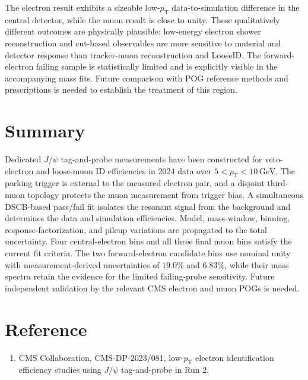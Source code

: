 \documentclass[11pt,a4paper]{article}
\newcommand{\pt}{p_{\mathrm{T}}}
\begin{document}
The electron result exhibits a sizeable low-$\pt$ data-to-simulation difference in the central detector, while the muon result is close to unity.  These qualitatively different outcomes are physically plausible: low-energy electron shower reconstruction and cut-based observables are more sensitive to material and detector response than tracker-muon reconstruction and LooseID.  The forward-electron failing sample is statistically limited and is explicitly visible in the accompanying mass fits.  Future comparison with POG reference methods and prescriptions is needed to establish the treatment of this region.

\section{Summary}

Dedicated $J/\psi$ tag-and-probe measurements have been constructed for veto-electron and loose-muon ID efficiencies in 2024 data over $5<\pt<10\,\mathrm{GeV}$.  The parking trigger is external to the measured electron pair, and a disjoint third-muon topology protects the muon measurement from trigger bias.  A simultaneous DSCB-based pass/fail fit isolates the resonant signal from the background and determines the data and simulation efficiencies.  Model, mass-window, binning, response-factorization, and pileup variations are propagated to the total uncertainty.  Four central-electron bins and all three final muon bins satisfy the current fit criteria.  The two forward-electron candidate bins use nominal unity with measurement-derived uncertainties of $19.0\%$ and $6.83\%$, while their mass spectra retain the evidence for the limited failing-probe sensitivity.  Future independent validation by the relevant CMS electron and muon POGs is needed.

\section*{Reference}
\begin{enumerate}[leftmargin=7mm]
  \item CMS Collaboration, CMS-DP-2023/081, low-$\pt$ electron identification efficiency studies using $J/\psi$ tag-and-probe in Run 2.
\end{enumerate}
\end{document}
